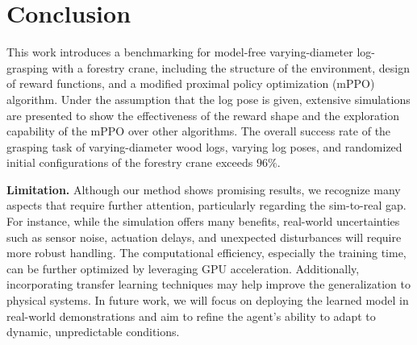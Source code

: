 \section{Conclusion}\label{Sec:con}
This work introduces a benchmarking for model-free varying-diameter log-grasping with a forestry crane, including the structure of the environment, design of reward functions, and a modified proximal policy optimization (mPPO) algorithm. Under the assumption that the log pose is given, extensive simulations are presented to show the effectiveness of the reward shape and the exploration capability of the mPPO over other algorithms. The overall success rate of the grasping task of varying-diameter wood logs, varying log poses, and randomized initial configurations of the forestry crane exceeds $96\%$. 

\textbf{Limitation.} Although our method shows promising results, we recognize many aspects that require further attention, particularly regarding the sim-to-real gap. For instance, while the simulation offers many benefits, real-world uncertainties such as sensor noise, actuation delays, and unexpected disturbances will require more robust handling. The computational efficiency, especially the training time, can be further optimized by leveraging GPU acceleration. Additionally, incorporating transfer learning techniques may help improve the generalization to physical systems. In future work, we will focus on deploying the learned model in real-world demonstrations and aim to refine the agent’s ability to adapt to dynamic, unpredictable conditions. 






